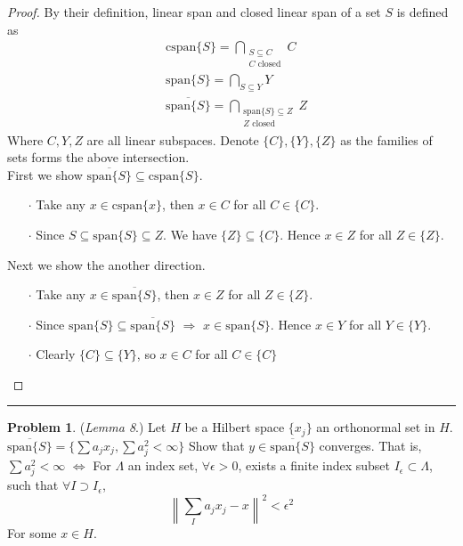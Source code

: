 \documentclass[a4paper, 10pt]{article}
\theoremstyle{definition}
\newtheorem{problem}{Problem}
\theoremstyle{hSol}
\begin{document}
\begin{proof} By their definition, linear span and closed linear span of a set $S$ is defined as
\begin{equation}
	\begin{split}
		& \text{cspan}\{S\} = \bigcap_{\substack{S\subseteq C \\ C \text{ closed}}}C \\
		& \text{span}\{S\} = \bigcap_{S\subseteq Y}Y \\
		& \overline{\text{span}\{S\}} = \bigcap_{\substack{\text{span}\{S\}\subseteq Z \\ Z\text{ closed}}}Z
	\end{split}
\end{equation}
Where $C,Y,Z$ are all linear subspaces. Denote $\{C\}, \{Y\}, \{Z\}$ as the families of sets forms the above intersection.\\
First we show $\overline{\text{span}\{S\}} \subseteq\text{cspan}\{S\}$.
\begin{itemize}
	\item[$\cdot$] Take any $x\in \text{cspan}\{x\}$, then $x\in C$ for all $C\in \{C\}$.
	\item[$\cdot$] Since $S\subseteq \text{span}\{S\}\subseteq Z$. We have $\{Z\}\subseteq \{C\}$. Hence $x\in Z$ for all $Z\in \{Z\}$. 
\end{itemize}
Next we show the another direction.
\begin{itemize}
	\item[$\cdot$] Take any $x\in \overline{\text{span}\{S\}}$, then $x\in Z$ for all $Z\in \{Z\}$.
	\item[$\cdot$] Since $\text{span}\{S\}\subseteq \overline{\text{span}\{S\}}$ $\Rightarrow$ $x\in \text{span}\{S\}$. Hence $x\in Y$ for all $Y\in \{Y\}$. 
	\item[$\cdot$] Clearly $\{C\}\subseteq \{Y\}$, so $x\in C$ for all $C\in \{C\}$
\end{itemize}

\end{proof}

\noindent\rule{16cm}{0.4pt}
\begin{problem} (\textit{Lemma 8}.) Let $H$ be a Hilbert space $\{x_j\}$ an orthonormal set in $H$. $\overline{\text{span}\{S\}}=\{\sum a_j x_j, \sum a_j^2 < \infty\}$
Show that $y\in\overline{\text{span}\{S\}}$ converges. That is, \\
$\sum a_j^2 < \infty$ $\iff$ For $\Lambda$ an index set, $\forall \epsilon >0$, exists a finite index subset $I_{\epsilon} \subset \Lambda$, such that $\forall I \supset I_{\epsilon}$,
$$\left\|\sum_I a_j x_j - x\right\|^2 < \epsilon^2$$
For some $x\in H$.
\end{problem}
\end{document}
